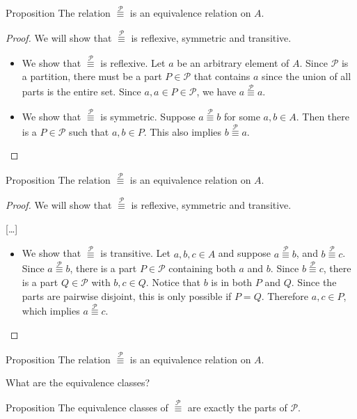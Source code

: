 \documentclass{beamer}
\def\bl[#1]#2{\begin{block}{#1}#2\end{block}}
\def\itemb{\begin{itemize}}
\def\iteme{\end{itemize}}
\begin{document}
\begin{frame}
\bl[Proposition]{
The relation $\stackrel{\mathcal{P}}{\equiv}$ is an equivalence relation on $A$.
}
\begin{proof}
We will show that $\stackrel{\mathcal{P}}{\equiv}$ is reflexive, symmetric and transitive.
\itemb
\item We show that $\stackrel{\mathcal{P}}{\equiv}$ is reflexive. Let $a$ be an arbitrary element of $A$. Since $\mathcal{P}$ is a partition, there must be a part $P\in\mathcal{P}$ that contains $a$ since the union of all parts is the entire set. Since $a,a\in P\in\mathcal{P}$, we have $a\stackrel{\mathcal{P}}{\equiv}a$.
\item We show that $\stackrel{\mathcal{P}}{\equiv}$ is symmetric. Suppose $a\stackrel{\mathcal{P}}{\equiv}b$ for some $a,b\in A$. Then there is a $P\in\mathcal{P}$ such that $a,b\in P$. This also implies $b\stackrel{\mathcal{P}}{\equiv}a$.
\iteme
\end{proof}
\end{frame}

\begin{frame}
\bl[Proposition]{
The relation $\stackrel{\mathcal{P}}{\equiv}$ is an equivalence relation on $A$.
}
\begin{proof}
We will show that $\stackrel{\mathcal{P}}{\equiv}$ is reflexive, symmetric and transitive.

[\dots]
\itemb
\item We show that $\stackrel{\mathcal{P}}{\equiv}$ is transitive. Let $a,b,c\in A$ and suppose $a\stackrel{\mathcal{P}}{\equiv}b$, and $b\stackrel{\mathcal{P}}{\equiv}c$. Since $a\stackrel{\mathcal{P}}{\equiv}b$, there is a part $P\in\mathcal{P}$ containing both $a$ and $b$. Since $b\stackrel{\mathcal{P}}{\equiv}c$, there is a part $Q\in\mathcal{P}$ with $b,c\in Q$. Notice that $b$ is in both $P$ and $Q$. Since the parts are pairwise disjoint, this is only possible if $P=Q$. Therefore $a,c\in P$, which implies $a\stackrel{\mathcal{P}}{\equiv}c$.
\iteme
\end{proof}
\end{frame}

\begin{frame}
\bl[Proposition]{
The relation $\stackrel{\mathcal{P}}{\equiv}$ is an equivalence relation on $A$.
}
What are the equivalence classes?
\bl[Proposition]{
The equivalence classes of $\stackrel{\mathcal{P}}{\equiv}$ are exactly the parts of $\mathcal{P}$.
}

\end{frame}
\end{document}
